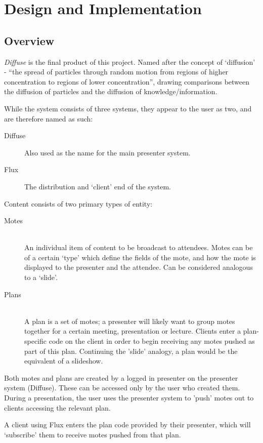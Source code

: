 \documentclass[a4papert,11pt,notitlepage]{ltxdoc}
\begin{document}
\pagebreak
\section{Design and Implementation}
\subsection{Overview}
\emph{Diffuse} is the final product of this project. Named after the concept of `diffusion' - ``the spread of particles through random motion from regions of higher concentration to regions of lower concentration''\cite{diffusionwikipedia:web}, drawing comparisons between the diffusion of particles and the diffusion of knowledge/information.

While the system consists of three systems, they appear to the user as two, and are therefore named as such:
\begin{description}
\item[Diffuse]
Also used as the name for the main presenter system.
\item[Flux]
The distribution and `client' end of the system.
\end{description}

Content consists of two primary types of entity:
\begin{description}
\item[Motes] \hfill \\
An individual item of content to be broadcast to attendees. Motes can be of a certain `type' which define the fields of the mote, and how the mote is displayed to the presenter and the attendee. Can be considered analogous to a `slide'.
\item[Plans] \hfill \\
A plan is a set of motes; a presenter will likely want to group motes together for a certain meeting, presentation or lecture. Clients enter a plan-specific code on the client in order to begin receiving any motes pushed as part of this plan. Continuing the 'slide' analogy, a plan would be the equivalent of a slideshow.
\end{description}

Both motes and plans are created by a logged in presenter on the presenter system (Diffuse). These can be accessed only by the user who created them. During a presentation, the user uses the presenter system to 'push' motes out to clients accessing the relevant plan.

A client using Flux enters the plan code provided by their presenter, which will `subscribe' them to receive motes pushed from that plan.
\end{document}
